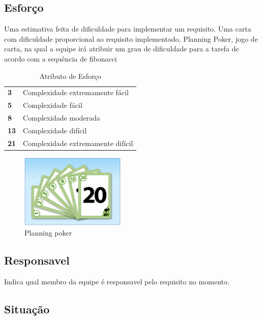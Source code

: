 \subsection{Esforço}

	Uma estimativa feita de dificuldade para implementar um requisito. Uma carta com dificuldade proporcional ao requisito implementado,
  Planning Poker, jogo de carta, na qual a equipe irá atribuir um grau de dificuldade para a tarefa de acordo com a sequência de
  fibonacci

  \begin{table}[!htb]
    \centering
    \begin{tabular}{p{5cm}p{10cm}}
      \toprule
      \textbf{3}  & Complexidade extremamente fácil   \\
      \textbf{5}  & Complexidade fácil                \\
      \textbf{8}  & Complexidade moderada             \\
      \textbf{13} & Complexidade difícil              \\
      \textbf{21} & Complexidade extremamente difícil \\
      \bottomrule
    \end{tabular}
    \caption{Atributo de Esforço}
  \end{table}

  \begin{figure}[!htb]
  		\centering
		\includegraphics[width=5cm]{figuras/gerenciamento/planning_poker.eps}
		\caption{Planning poker}
	\end{figure}

\subsection{Responsavel}

  Indica qual membro da equipe é responsavel pelo requisito no momento.

\subsection{Situação}

